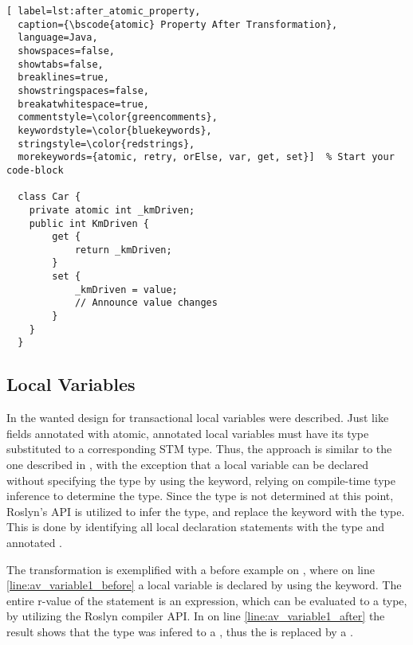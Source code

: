 \begin{lstlisting}[ label=lst:after_atomic_property,
  caption={\bscode{atomic} Property After Transformation},
  language=Java,  
  showspaces=false,
  showtabs=false,
  breaklines=true,
  showstringspaces=false,
  breakatwhitespace=true,
  commentstyle=\color{greencomments},
  keywordstyle=\color{bluekeywords},
  stringstyle=\color{redstrings},
  morekeywords={atomic, retry, orElse, var, get, set}]  % Start your code-block

  class Car {
    private atomic int _kmDriven;
    public int KmDriven {
        get {
            return _kmDriven;
        }
        set {
            _kmDriven = value;
            // Announce value changes
        }
    }
  }
\end{lstlisting}


\subsection{Local Variables}
In  the wanted design for transactional local variables were described. Just like fields annotated with atomic, annotated local variables must have its type substituted to a corresponding \ac{STM} type. Thus, the approach is similar to the one described in , with the exception that a local variable can be declared without specifying the type by using the  keyword, relying on compile-time type inference to determine the type. Since the type is not determined at this point, Roslyn's \ac{API} is utilized to infer the type, and replace the  keyword with the type. This is done by identifying all local declaration statements with the type  and annotated . 

The transformation is exemplified with a before example on , where on line \ref{line:av_variable1_before} a local variable is declared by using the  keyword. The entire r-value of the statement is an expression, which can be evaluated to a type, by utilizing the Roslyn compiler \ac{API}. In  on line  \ref{line:av_variable1_after} the result shows that the type was infered to a , thus the  is replaced by a .

